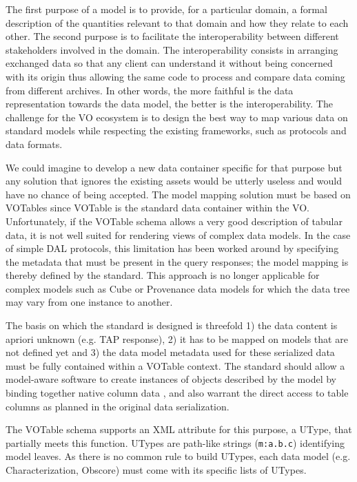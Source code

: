 
The first purpose of a model is to provide, for a particular domain, a formal description of the quantities relevant to that domain and how they relate to each other.
The second purpose is to facilitate the interoperability between  different stakeholders involved in the domain. The interoperability consists in arranging exchanged data 
so that any client can understand it without being concerned with its origin thus allowing the same code to process and compare data coming from different archives.  
In other words, the more faithful is the data representation towards the data model, the better is the interoperability.
The challenge for the VO ecosystem is to design the best way to map various data on standard models while respecting the existing frameworks, such as protocols and data formats.

We could imagine to develop a new data container specific for that purpose but any solution that ignores the existing assets would be utterly useless and would have no chance of being accepted.
The model mapping solution must be based on VOTables since VOTable  \citep{2019ivoa.spec.1021O} is the standard data container within the VO.
Unfortunately, if the VOTable schema allows a very good description of tabular data, it is not well suited for rendering views of complex data models.
In the case of simple DAL protocols, this limitation has been worked around by specifying the metadata that must be present in the query responses; the model mapping is thereby defined by the standard.
This approach is no longer applicable for complex models such as Cube or Provenance data models for which the data tree may vary from one instance to another.

The basis on which the standard is designed is threefold 1) the data content is apriori unknown (e.g. TAP response), 2) it has to be mapped on models that are not defined yet and 3) the data model metadata used for these serialized data must be fully contained within a VOTable context.
The  standard should allow a model-aware software to create instances of objects described by the model by binding together native column data , and also warrant the direct access to table columns as planned in the original data serialization.


The VOTable schema supports an XML attribute for this purpose, a UType, that partially meets this function. 
UTypes are path-like strings (\texttt{m:a.b.c}) identifying model leaves. As there is no common rule to build UTypes,  each data model (e.g. Characterization, Obscore)  must come with its specific lists of UTypes. 

